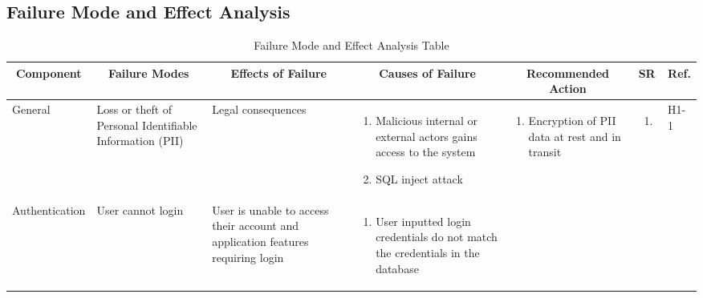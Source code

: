 \documentclass{article}
\begin{document}
\newpage
\begin{landscape}
	\section{Failure Mode and Effect Analysis}
	\begin{longtable}{|p{}|p{}|p{}|p{}|p{}|p{}|p{}|}
		\caption{Failure Mode and Effect Analysis Table}                                                                \\
		\hline
		\multicolumn{1}{|c|}{\textbf{Component}}
		 & \multicolumn{1}{|c|}{\textbf{Failure Modes}}
		 & \multicolumn{1}{|c|}{\textbf{Effects of Failure}}
		 & \multicolumn{1}{|c|}{\textbf{Causes of Failure}}
		 & \multicolumn{1}{|c|}{\textbf{Recommended Action}}
		 & \multicolumn{1}{|c|}{\textbf{SR}}
		 & \multicolumn{1}{|c|}{\textbf{Ref.}}                                                                          \\
		\hline
		General
		 & Loss or theft of Personal Identifiable Information (PII)
		 & Legal consequences
		 & \begin{enumerate}[label=\alph*., leftmargin=*]
			   \item Malicious internal or external actors gains access to the system
			   \item SQL inject attack
		   \end{enumerate}
		 & \begin{enumerate}[label=\alph*., leftmargin=*]
			   \item Encryption of PII data at rest and in transit
		   \end{enumerate}
		 & \begin{enumerate}[label=\alph*., leftmargin=*]
			   \item
		   \end{enumerate}
		 & H1-1                                                                                                         \\
		\hline
		\multirow{2}{*}{Authentication}
		 & User cannot login
		 & User is unable to access their account and application features requiring login
		 & \begin{enumerate}[label=\alph*., leftmargin=*]
			   \item User inputted login credentials do not match the credentials in the database
		   \end{enumerate}
		 & \begin{enumerate}[label=\alph*., leftmargin=*]

\end{enumerate}
\end{longtable}
\end{landscape}
\end{document}
